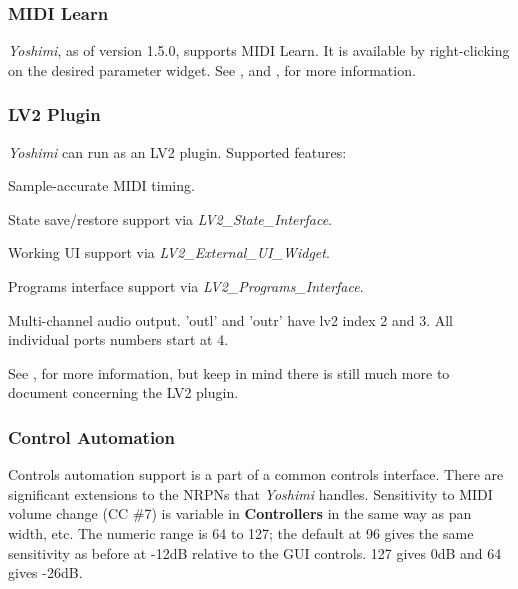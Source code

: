\documentclass[
 11pt,
 twoside,
 a4paper,
 final                                 %
]{article}
\begin{document}
\subsubsection{MIDI Learn}
\label{subsubsec:new_features_midi_learn}

   \textsl{Yoshimi}, as of version 1.5.0, supports MIDI Learn.
   It is available by right-clicking on the desired parameter widget.
   See ,
   and , for more information.

\subsubsection{LV2 Plugin}
\label{subsubsec:new_features_lv2_plugin}

   \textsl{Yoshimi} can run as an LV2 plugin.  Supported features:

   \begin{enumber}
      \item Sample-accurate MIDI timing.
      \item State save/restore support via \textsl{LV2\_State\_Interface}.
      \item Working UI support via \textsl{LV2\_External\_UI\_Widget}.
      \item Programs interface support via \textsl{LV2\_Programs\_Interface}.
      \item Multi-channel audio output.
         'outl' and 'outr' have lv2 index 2 and 3.
         All individual ports numbers start at 4.
   \end{enumber}

   See , for more information, but keep in
   mind there is still much more to document concerning the LV2 plugin.

\subsubsection{Control Automation}
\label{subsubsec:new_features_control_automation}

   Controls automation support is a part of a common
   controls interface.  There are significant extensions to the NRPNs that
   \textsl{Yoshimi} handles.
   Sensitivity to MIDI volume change (CC \#7) is variable in
   \textbf{Controllers} in the same way as pan width, etc. The numeric range is
   64 to 127; the default at 96 gives the same sensitivity as before at -12dB
   relative to the GUI controls.  127 gives 0dB and 64 gives -26dB.
\end{document}
